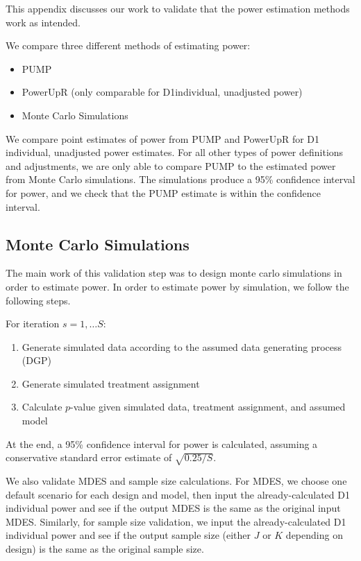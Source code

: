 \documentclass[
]{article}
\providecommand{\tightlist}{%
  \setlength{\itemsep}{0pt}\setlength{\parskip}{0pt}}
\begin{document}
This appendix discusses our work to validate that the power estimation
methods work as intended.

We compare three different methods of estimating power:

\begin{itemize}
\tightlist
\item
  PUMP
\item
  PowerUpR (only comparable for D1individual, unadjusted power)
\item
  Monte Carlo Simulations
\end{itemize}

We compare point estimates of power from PUMP and PowerUpR for D1
individual, unadjusted power estimates. For all other types of power
definitions and adjustments, we are only able to compare PUMP to the
estimated power from Monte Carlo simulations. The simulations produce a
95\% confidence interval for power, and we check that the PUMP estimate
is within the confidence interval.

\subsection{Monte Carlo Simulations}

The main work of this validation step was to design monte carlo
simulations in order to estimate power. In order to estimate power by
simulation, we follow the following steps.

For iteration \(s = 1, \dots S\):

\begin{enumerate}
\def\labelenumi{\arabic{enumi}.}
\tightlist
\item
  Generate simulated data according to the assumed data generating
  process (DGP)
\item
  Generate simulated treatment assignment
\item
  Calculate \(p\)-value given simulated data, treatment assignment, and
  assumed model
\end{enumerate}

At the end, a 95\% confidence interval for power is calculated, assuming
a conservative standard error estimate of \(\sqrt{0.25/S}\).

We also validate MDES and sample size calculations. For MDES, we choose
one default scenario for each design and model, then input the
already-calculated D1 individual power and see if the output MDES is the
same as the original input MDES. Similarly, for sample size validation,
we input the already-calculated D1 individual power and see if the
output sample size (either \(J\) or \(K\) depending on design) is the
same as the original sample size.
\end{document}
